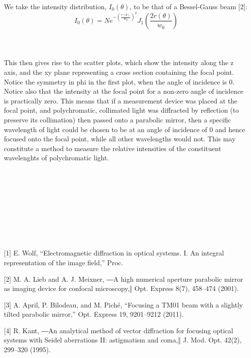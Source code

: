 \documentclass{article}
\begin{document}
    We take the intensity distribution, \(I_0(\theta)\), to be that of a Bessel-Gauss beam [2]:
    \[I_0(\theta) = Ne^{-\left(\frac{r(\theta)}{w_0}\right)^2} J_1\left(\frac{2r(\theta)}{w_0}\right)\]
    \\
    \\
    \\This then gives rise to the scatter plots, which show the intensity along the z axis, and the xy plane representing a cross section containing the focal point. Notice the symmetry in phi in the first plot, when the angle of incidence is 0. Notice also that the intensity at the focal point for a non-zero angle of incidence is practically zero. This means that if a measurement device was placed at the focal point, and polychromatic, collimated light was diffracted by reflection (to preserve its collimation) then passed onto a parabolic mirror, then a specific wavelength of light could be chosen to be at an angle of incidence of 0 and hence focused onto the focal point, while all other wavelengths would not. This may constitute a method to measure the relative intensities of the constituent wavelenghts of polychromatic light. \\
    \\
    \\
    \\
    \\
    \\
    \\
    \\
    \\
    \\

    [1] E. Wolf, “Electromagnetic diffraction in optical systems. I. An integral representation of the image field,” Proc.


    [2] M. A. Lieb and A. J. Meixner, ―A high numerical aperture parabolic mirror as imaging device for confocal
microscopy,‖ Opt. Express 8(7), 458–474 (2001).

    [3] A. April, P. Bilodeau, and M. Piché, “Focusing a TM01 beam with a slightly tilted parabolic mirror,” Opt.
Express 19, 9201–9212 (2011).

    [4] R. Kant, ―An analytical method of vector diffraction for focusing optical systems with Seidel aberrations II:
astigmatism and coma,‖ J. Mod. Opt. 42(2), 299–320 (1995).
\end{document}
